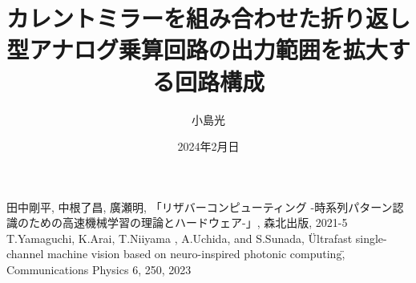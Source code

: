 \documentclass[a4,12pt,dvipdfmx]{jreport}
\title{\mbox{カレントミラーを組み合わせた}\mbox{折り返し型アナログ乗算回路の}\mbox{出力範囲を拡大する回路構成}}
\date{2024年2月日}
\author{小島\hspace{1zw}光}
\numberwithin{equation}{chapter}
\begin{document}
\maketitle[%
]




            

%
%
\begin{thebibliography}{9}
  田中剛平, 中根了昌, 廣瀬明, 「リザバーコンピューティング -時系列パターン認識のための高速機械学習の理論とハードウェア-」, 森北出版, 2021-5
  T.Yamaguchi, K.Arai, T.Niiyama , A.Uchida, and S.Sunada, \"Ultrafast single-channel machine vision based on neuro-inspired photonic computing\", Communications Physics 6, 250, 2023
\end{thebibliography}



%
\end{document}
